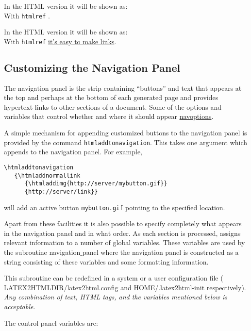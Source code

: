 \begin{htmlonly}
In the HTML version it will be shown as: \\
With {\tt htmlref} .
\end{htmlonly}
\begin{latexonly}
In the HTML version it will be shown as: \\
With {\tt htmlref} \underline{it's easy to make links}.
\end{latexonly}


\subsection{Customizing the Navigation Panel}
 \label{sec:navpanel}
The navigation panel is the strip containing ``buttons'' and text
that appears at the top
and perhaps at the bottom of each generated page and provides
hypertext
links to other sections of a document. Some of the
options and variables that control whether and where it should appear 
\hyperref{have already been mentioned}{have already been mentioned in 
Section }{}{navoptions}. 


A simple mechanism for appending customized buttons to the navigation
panel is provided by the command {\tt htmladdtonavigation}. This takes
one
argument which \latextohtml appends to the navigation panel. For
example,
\begin{verbatim}
\htmladdtonavigation
   {\htmladdnormallink
      {\htmladdimg{http://server/mybutton.gif}}
      {http://server/link}}
\end{verbatim}
will add an active button {\tt mybutton.gif} pointing to the specified location.


Apart from these facilities it is
also 
possible to specify completely what appears in the navigation panel 
and in what order. As each section is processed, \latextohtml
assigns relevant information to a number of global variables.
These variables are used by the subroutine {\fn navigation$\_$panel}
where the navigation panel is constructed as a string consisting of
these variables and some formatting information. 

This subroutine
can be redefined in a system or a user configuration file ({\fn
LATEX2HTMLDIR/latex2html.config} and {\fn HOME/.latex2html-init} 
respectively). {\em Any combination of text, HTML tags, 
and the variables mentioned below is acceptable}. 

The control panel variables are:

